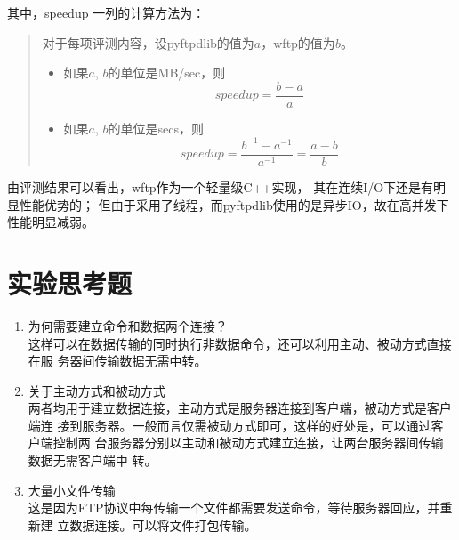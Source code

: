 \documentclass[a4paper]{article}
\begin{document}
其中，speedup 一列的计算方法为：
\begin{quote}
	对于每项评测内容，设pyftpdlib的值为$a$，wftp的值为$b$。
	\begin{itemize}
		\item 如果$a$, $b$的单位是MB/sec，则
			\[ speedup = \dfrac{b-a}{a} \]
		\item 如果$a$, $b$的单位是secs，则
			\[ speedup = \dfrac{b^{-1}-a^{-1}}{a^{-1}} = \dfrac{a-b}{b} \]
	\end{itemize}
\end{quote}

由评测结果可以看出，wftp作为一个轻量级C++实现，
其在连续I/O下还是有明显性能优势的；
但由于采用了线程，而pyftpdlib使用的是异步IO，故在高并发下性能明显减弱。

\section{实验思考题}
\begin{enumerate}
	\item 为何需要建立命令和数据两个连接？ \\
		这样可以在数据传输的同时执行非数据命令，还可以利用主动、被动方式直接在服
		务器间传输数据无需中转。
	\item 关于主动方式和被动方式 \\
		两者均用于建立数据连接，主动方式是服务器连接到客户端，被动方式是客户端连
		接到服务器。一般而言仅需被动方式即可，这样的好处是，可以通过客户端控制两
		台服务器分别以主动和被动方式建立连接，让两台服务器间传输数据无需客户端中
		转。
	\item 大量小文件传输 \\
		这是因为FTP协议中每传输一个文件都需要发送命令，等待服务器回应，并重新建
		立数据连接。可以将文件打包传输。
\end{enumerate}
\end{document}
